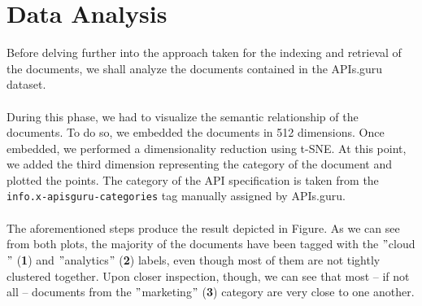 \section{Data Analysis}\label{sec:data-analysis}
Before delving further into the approach taken for the indexing and retrieval of the documents, we shall analyze the documents contained in the APIs.guru dataset. \\ \\
During this phase, we had to visualize the semantic relationship of the documents.
To do so, we embedded the documents in 512 dimensions.
Once embedded, we performed a dimensionality reduction using t-SNE\@.
At this point, we added the third dimension representing the category of the document and plotted the points.
The category of the API specification is taken from the \verb|info.x-apisguru-categories| tag manually assigned by APIs.guru. \\ \\
The aforementioned steps produce the result depicted in Figure.
As we can see from both plots, the majority of the documents have been tagged with the \("\)cloud\("\) (\textbf{1}) and \("\)analytics\("\) (\textbf{2}) labels, even though most of them are not tightly clustered together.
Upon closer inspection, though, we can see that most – if not all – documents from the \("\)marketing\("\) (\textbf{3}) category are very close to one another.

